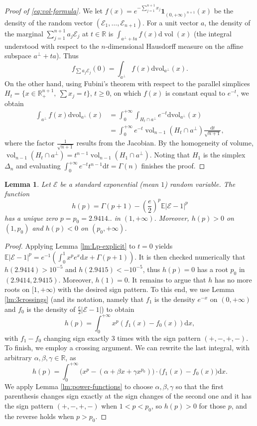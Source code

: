 \documentclass[10pt]{amsart}
\newcommand{\dd}{\mathrm{d}}
\newcommand{\E}{\mathbb{E}}
\newcommand{\1}{\textbf{1}}
\newcommand{\R}{\mathbb{R}}
\newcommand{\red}{}
\newcommand{\cE}{\mathcal{E}}
\DeclareMathOperator{\vol}{vol}
\newtheorem{lemma}[theorem]{Lemma}
\theoremstyle{remark}
\theoremstyle{definition}
\begin{document}
\begin{proof}[Proof of \eqref{eq:vol-formula}]
We let $f(x) = e^{-\sum_{j=1}^{n+1} x_j}\1_{(0,{+\infty})^{n+1}}(x)$ be the density of the random vector $(\cE_1, \dots, \cE_{n+1})$. For a unit vector $a$, the density of the marginal $\sum_{j=1}^{n+1} a_j\cE_j$ at $t \in \R$ is $\int_{a^\perp + ta} f(x) \dd\vol(x)$ (the integral understood with respect to the $n$-dimensional Hausdorff measure on the affine subspace $a^\perp + ta$). Thus
\[ 
f_{\sum a_j\cE_j}(0) = \int_{a^\perp} f(x) \text{dvol}_{a^\perp}(x).
 \]
On the other hand, using Fubini's theorem with respect to the parallel simplices $H_t = \{x \in \R_+^{n+1}, \ \sum x_j = t\}$, $t \geq 0$, on which $f(x)$ is constant equal to $e^{-t}$, we obtain
\begin{align*}
 \int_{a^\perp} f(x) \text{dvol}_{a^\perp}(x) &= \int_0^{+\infty} \int_{H_t \cap a^\perp} e^{-t}\text{dvol}_{a^\perp}(x) \\
&= \int_0^{+\infty} e^{-t}\vol_{n-1}(H_t \cap a^\perp) \frac{\dd t}{\sqrt{n+1}},
 \end{align*}
where the factor $\frac{1}{\sqrt{n+1}}$ results from the Jacobian. By the homogeneity of volume, $\vol_{n-1}(H_t \cap a^\perp)  = t^{n-1}\vol_{n-1}(H_1 \cap a^\perp)$. Noting that $H_1$ is the simplex $\Delta_n$ and evaluating $\int_0^{+\infty} e^{-t} t^{n-1} \dd t = \Gamma(n)$ finishes the proof.
\end{proof}


\begin{lemma}\label{lm:Cp}
Let $\cE$ be a standard exponential (mean $1$) random variable. The function 
\[ 
h(p) = \Gamma(p+1) - \left(\frac{e}{2}\right)^p\E|\cE-1|^p
 \]
has a unique zero $p = p_0 = 2.9414..$ in $(1, {+\infty})$. Moreover, $h(p) > 0$ on $(1, p_0)$ and $h(p) < 0$ on $(p_0,+ \infty)$.
\end{lemma}
\begin{proof}
Applying Lemma \ref{lm:Lp-explicit} to $t = 0$ yields $\E|\cE-1|^p = e^{-1}\left(\int_0^1x^pe^x \dd x  +\Gamma(p+1)\right)$. It is then checked numerically that $h(2.9414) > 10^{-5}$ and $h(2.9415) < -10^{-5}$, thus $h(p)=0$ has a root $p_0$ in $(2.9414, 2.9415)$. Moreover, $h(1) = 0$.
It remains to argue that $h$ has no more roots on $[1,{+\infty})$ with the desired sign pattern. To this end, we use Lemma \ref{lm:3crossings} (and its notation, namely that $f_1$ is the density $e^{-x}$ on $(0,{+\infty})$ and $f_0$ is the density of $\frac{e}{2}|\cE-1|$) to obtain
\[ 
h(p) = \int_0^{+\infty} x^p(f_1(x) - f_0(x)){\red \dd x,}
 \]
with $f_1 - f_0$ changing sign exactly $3$ times with the sign pattern $(+,-,+,-)$.
To finish, we employ a crossing argument. We can rewrite the last integral, with arbitrary $\alpha, \beta, \gamma \in \R$, as
\[ 
h(p) = \int_0^{+\infty} \Big(x^p-(\alpha+\beta x + \gamma x^{p_0})\Big)\cdot\Big(f_1(x) - f_0(x)\Big)\dd x.
 \]
We apply Lemma \ref{lm:power-functions} to choose $\alpha, \beta, \gamma$ so that the first parenthesis changes sign exactly at the sign changes of the second one and it {\red has} the sign pattern $(+,-,+,-)$ when $1 < p < p_0$, so $h(p) > 0$ for those $p$, and the reverse holds when $p > p_0$.
\end{proof}
\end{document}
